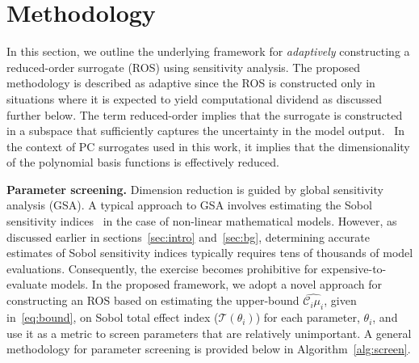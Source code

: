 \section{Methodology}
\label{sec:method}

%

In this section, we outline the underlying framework for \emph{adaptively}
constructing a reduced-order surrogate (ROS) using sensitivity analysis.  The
proposed methodology is described as adaptive since the ROS is constructed only
in situations where it is expected to yield computational dividend as discussed
further below.  The term reduced-order implies that the surrogate is
constructed in a subspace that sufficiently captures the uncertainty in the
model output.~
In the context of PC surrogates used in this work, it implies
that the dimensionality of the polynomial basis functions is effectively
reduced. 

\textbf{Parameter screening.}
Dimension reduction is guided by global sensitivity analysis (GSA).  A typical
approach to GSA involves estimating the Sobol sensitivity
indices~\cite{Sobol:2001} in the case of non-linear mathematical models.
However, as discussed earlier in sections~\ref{sec:intro} and~\ref{sec:bg},
determining accurate estimates of Sobol sensitivity indices typically requires
tens of thousands of model evaluations. Consequently, the exercise becomes
prohibitive for expensive-to-evaluate models.  In the proposed framework, we
adopt a novel approach for constructing an ROS based on estimating the
upper-bound $\widehat{\mathcal{C}_i\mu_i}$, given in~\eqref{eq:bound}, on 
Sobol total effect index ($\mathcal{T}(\theta_i)$) for each 
parameter, $\theta_i$, and use it as a metric to screen 
parameters that are relatively unimportant. A general
methodology for parameter screening is provided below in
Algorithm~\ref{alg:screen}.

